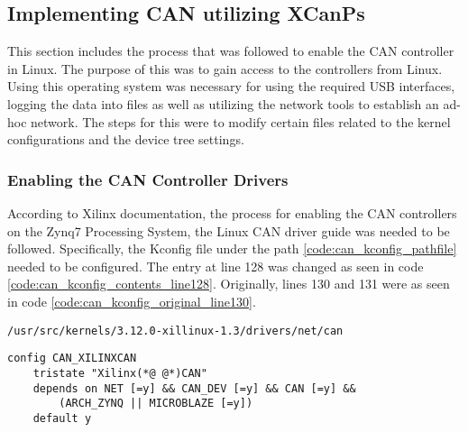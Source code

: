 \subsection{Implementing CAN utilizing XCanPs}\label{sec:methods_to_implement_can}


This section includes the process that was followed to enable the CAN controller in Linux.
The purpose of this was to gain access to the controllers from Linux.
Using this operating system was necessary for using the required USB interfaces, logging the data into files as well as utilizing the network tools to establish an ad-hoc network.
The steps for this were to modify certain files related to the kernel configurations and the device tree settings.

\subsubsection*{Enabling the CAN Controller Drivers}

According to Xilinx documentation, the process for enabling the CAN controllers on the Zynq7 Processing System, the Linux CAN driver guide \cite{Xilinx_wiki_Linux_CAN_driver} was needed to be followed.
Specifically, the Kconfig file under the path \ref{code:can_kconfig_pathfile} needed to be configured.
The entry at line 128 was changed as seen in code \ref{code:can_kconfig_contents_line128}.
Originally, lines 130 and 131 were as seen in code \ref{code:can_kconfig_original_line130}.

\begin{lstlisting}[caption={CAN Kconfig pathfile.},numbers=none,label=code:can_kconfig_pathfile]
/usr/src/kernels/3.12.0-xillinux-1.3/drivers/net/can
\end{lstlisting}

\begin{lstlisting}[firstnumber=128,caption={Kconfig file contents from line 128.},label={code:can_kconfig_contents_line128}]
config CAN_XILINXCAN
	tristate "Xilinx(*@ @*)CAN"
	depends on NET [=y] && CAN_DEV [=y] && CAN [=y] && 
        (ARCH_ZYNQ || MICROBLAZE [=y])
	default y
\end{lstlisting}


